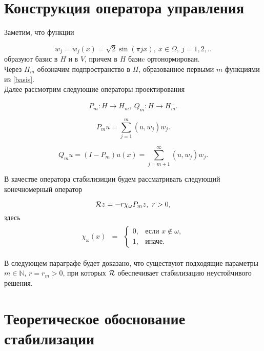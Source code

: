 \section{Конструкция оператора управления}
\vspace{1em}

Заметим, что функции

\begin{equation}\label{basis}
    w_j = w_j(x) = \sqrt{2}\sin{(\pi j x)}, \ x \in \Omega, \ j=1, 2, ..
\end{equation}
образуют базис в $H$ и в $V$, причем в $H$ базиc ортонормирован.\\
Через $H_m$ обозначим подпространство в $H$, образованное первыми $m$ функциями 
из \eqref{basis}.\\

Далее рассмотрим следующие операторы проектирования

$$P_m : H \rightarrow H_m, \ Q_m : H \rightarrow H_m^{\perp}.$$

\begin{equation}
    P_m u = \sum \limits_{j=1}^{m} {(u, w_j) w_j}.
\end{equation}

\begin{equation}
    Q_m u = (I - P_m)u(x) = \sum \limits_{j=m + 1}^{\infty} {(u, w_j) w_j}.
\end{equation}

В качестве оператора стабилизиции будем рассматривать следующий конечномерный
оператор

$$\mathcal{R}{z} = -r\chi_{\omega}P_mz, \ r > 0,$$
здесь
\begin{gather*}
    \begin{matrix}
        \chi_{\omega}(x) & =
        & \left\{
        \begin{matrix}
            0, & \mbox{если } x \notin \omega, \\
            1, & \mbox{иначе. }
        \end{matrix} \right.
    \end{matrix}
\end{gather*}

В следующем параграфе будет доказано, что существуют подходящие параметры 
$m \in \mathbb{N}$, $r = r_m > 0$, при которых $\mathcal{R}{}$ обеспечивает 
стабилизацию неустойчивого решения.

\section{Теоретическое обоснование стабилизации}
\vspace{1em}


